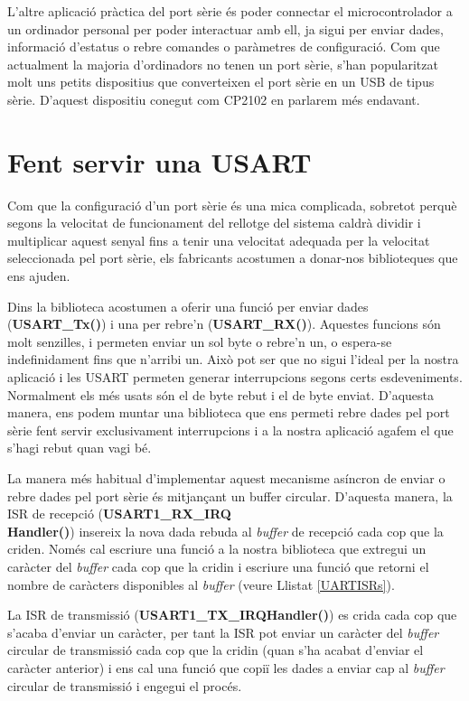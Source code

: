 L'altre aplicació pràctica del port sèrie és poder connectar el microcontrolador a un ordinador personal per poder interactuar amb ell, ja sigui per enviar dades, informació d'estatus o rebre comandes o paràmetres de configuració. Com que actualment la majoria d'ordinadors no tenen un port sèrie, s'han popularitzat molt uns petits dispositius que converteixen el port sèrie en un \gls{USB} de tipus sèrie. D'aquest dispositiu conegut com \gls{CP2102} en parlarem més endavant.

\section{Fent servir una USART}
Com que la configuració d'un port sèrie és una mica complicada, sobretot perquè segons la velocitat de funcionament del rellotge del sistema caldrà dividir i multiplicar aquest senyal fins a tenir una velocitat adequada per la velocitat seleccionada pel port sèrie, els fabricants acostumen a donar-nos biblioteques que ens ajuden.

Dins la biblioteca acostumen a oferir una funció per enviar dades ({\bf USART\_Tx()}) i una per rebre'n ({\bf USART\_RX()}). Aquestes funcions són molt senzilles, i permeten enviar un sol byte o rebre'n un, o espera-se indefinidament fins que n'arribi un. Això pot ser que no sigui l'ideal per la nostra aplicació i les \gls{USART} permeten generar interrupcions segons certs esdeveniments. Normalment els més usats són el de byte rebut i el de byte enviat. D'aquesta manera, ens podem muntar una biblioteca que ens permeti rebre dades pel port sèrie fent servir exclusivament interrupcions i a la nostra aplicació agafem el que s'hagi rebut quan vagi bé.

La manera més habitual d'implementar aquest mecanisme asíncron de enviar o rebre dades pel port sèrie és mitjançant un \gls{buffer circular}. D'aquesta manera, la \gls{ISR} de recepció ({\bf USART1\_RX\_IRQ\\Handler()}) insereix la nova dada rebuda al {\em buffer} de recepció cada cop que la criden. Només cal escriure una funció a la nostra biblioteca que extregui un caràcter del {\em buffer} cada cop que la cridin i escriure una funció que retorni el nombre de caràcters disponibles al {\em buffer} (veure Llistat \ref{UARTISRs}).

La ISR de transmissió ({\bf USART1\_TX\_IRQHandler()}) es crida cada cop que s'acaba d'enviar un caràcter, per tant la ISR pot enviar un caràcter del {\em buffer} circular de transmissió cada cop que la cridin (quan s'ha acabat d'enviar el caràcter anterior) i ens cal una funció que copiï les dades a enviar cap al {\em buffer} circular de transmissió i engegui el procés.

